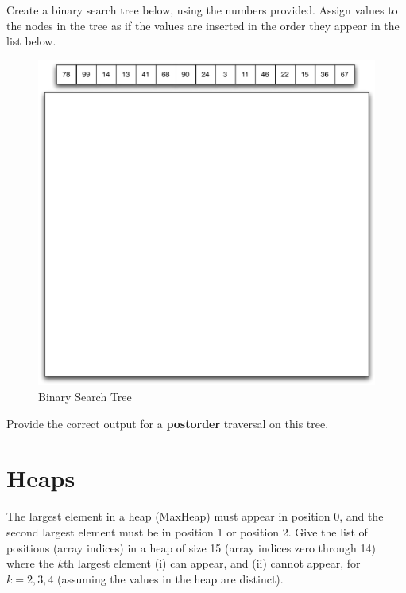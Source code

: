\documentclass[11pt]{exam}
\begin{document}
\begin{questions}
\question[14] Create a binary search tree below, using the numbers provided.   Assign values to the nodes in the tree as if the values are inserted in the order they appear in the list below.
\begin{figure}[htbp]
   \begin{centering}
      \includegraphics[width=6in]{exam2_binary_search_tree}
   \end{centering}
   \caption{Binary Search Tree}
   \label{fig:bst}
\end{figure}

\question[5] Provide the correct output for a {\bf postorder} traversal on this tree.




\newpage
\section*{Heaps}
\question The largest element in a heap (MaxHeap) must appear in position 0, and the second largest element must be in position 1 or position 2. Give the list of positions (array indices) in a heap of size 15 (array indices zero through 14) where the $k$th largest element (i) can appear, and (ii) cannot appear, for $k = 2, 3, 4$ (assuming the values in the heap are distinct).
\end{questions}
\end{document}
